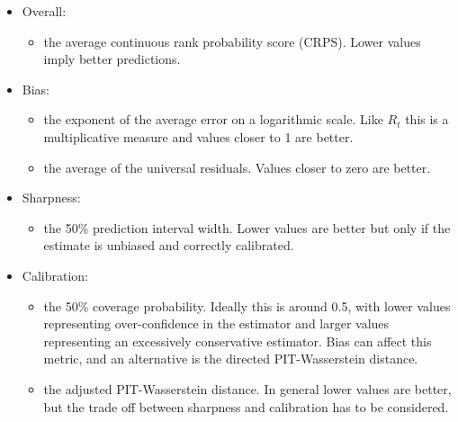\documentclass[a4paper, 12pt, twoside]{article}
\begin{document}
\begin{itemize}
 \item Overall:
 \begin{itemize}
  \item the average continuous rank probability score (CRPS). Lower values imply better predictions.
 \end{itemize}
 \item Bias:
 \begin{itemize}
  \item the exponent of the average error on a logarithmic scale. Like $R_t$ this is a multiplicative measure and values closer to 1 are better.
  \item the average of the universal residuals. Values closer to zero are better.
 \end{itemize}
 \item Sharpness:
 \begin{itemize}
  \item the 50\% prediction interval width. Lower values are better but only if the estimate is unbiased and correctly calibrated.
 \end{itemize}
 \item Calibration:
  \begin{itemize}
  \item the 50\% coverage probability. Ideally this is around 0.5, with lower values representing over-confidence in the estimator and larger values representing an excessively conservative estimator. Bias can affect this metric, and an alternative is the directed PIT-Wasserstein distance.
  \item the adjusted PIT-Wasserstein distance. In general lower values are better, but the trade off between sharpness and calibration has to be considered.
  \end{itemize}

\end{itemize}


\end{document}
